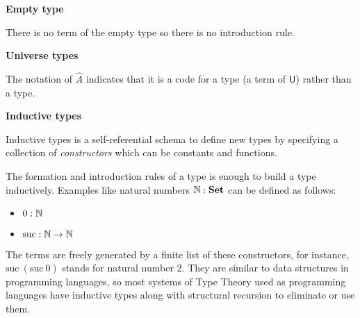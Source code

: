 

\textbf{Empty type}


\begin{multicols}{2}

\columnbreak


\end{multicols}

There is no term of the empty type so there is no introduction rule.

\textbf{Universe types}


\begin{multicols}{2}



\columnbreak


\end{multicols}

The notation of $\hat{A}$ indicates that it is a code for a type (a term of $\mathsf{U}$) rather than a type.


\textbf{Inductive types}\label{df:inductivetypes}

Inductive types is a self-referential schema to define new types by specifying a collection of \emph{constructors} which can be constants and functions.

The formation and introduction rules of a type is enough to build a type inductively. Examples like
natural numbers $\mathbb{N} : \operatorname{\mathbf{Set}}$ can be defined as follows:

\begin{itemize}
\item $0 : \mathbb{N}$
\item $\text{suc} : \mathbb{N} \rightarrow \mathbb{N}$
\end{itemize}

The terms are freely generated by a finite list of these constructors, for instance, $\text{suc} ~(\text{suc} ~0)$ stands for natural number $2$. They are similar to data structures in programming languages, so most systems of Type Theory used as programming languages have inductive types along with structural recursion to eliminate or use them.


